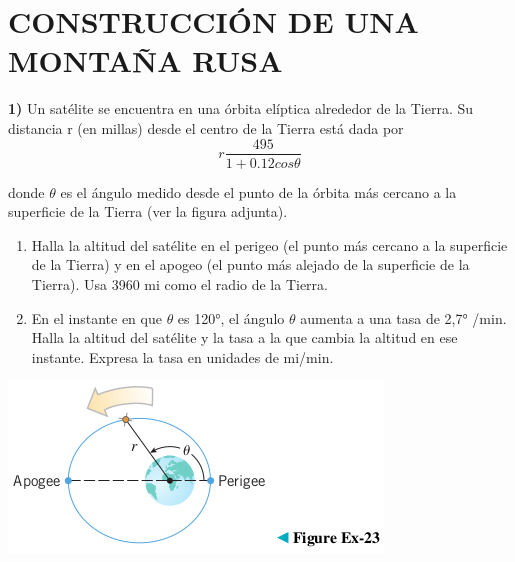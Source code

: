 \chapter*{CONSTRUCCIÓN DE UNA MONTAÑA RUSA}

\textbf{1)} Un satélite se encuentra en una órbita elíptica alrededor de la Tierra. Su distancia r (en millas) desde el centro de la Tierra está dada por$$r\frac{495}{1+0.12cos\theta}$$

donde $\theta$ es el ángulo medido desde el punto de la órbita más cercano a la superficie de la Tierra (ver la figura adjunta).
\begin{enumerate}[label=\alph*)]
    \item Halla la altitud del satélite en el perigeo (el punto más cercano a la superficie de la Tierra) y en el apogeo (el punto más alejado de la superficie de la Tierra). Usa 3960 mi como el radio de la Tierra.
    \item En el instante en que $\theta$ es 120°, el ángulo $\theta$ aumenta a una tasa de 2,7° /min. Halla la altitud del satélite y la tasa a la que cambia la altitud en ese instante. Expresa la tasa en unidades de mi/min.
\end{enumerate}
\begin{center}
    \includegraphics[height = 0.14\textheight]{recursos/image.png}\par
\end{center}

